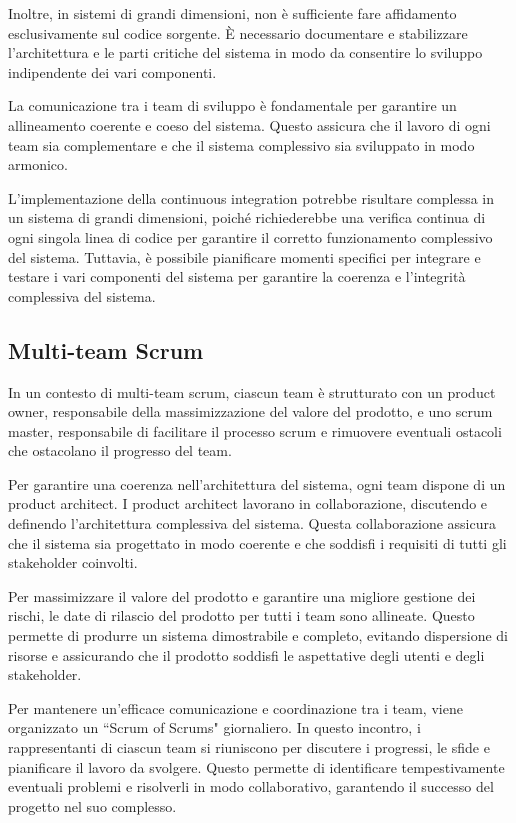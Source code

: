 Inoltre, in sistemi di grandi dimensioni, non è sufficiente fare affidamento
esclusivamente sul codice sorgente. È necessario documentare e stabilizzare
l'architettura e le parti critiche del sistema in modo da consentire lo sviluppo
indipendente dei vari componenti.

La comunicazione tra i team di sviluppo è fondamentale per garantire un allineamento
coerente e coeso del sistema. Questo assicura che il lavoro di ogni team sia complementare
e che il sistema complessivo sia sviluppato in modo armonico.

L'implementazione della continuous integration potrebbe risultare complessa in un sistema
di grandi dimensioni, poiché richiederebbe una verifica continua di ogni singola linea di
codice per garantire il corretto funzionamento complessivo del sistema. Tuttavia, è
possibile pianificare momenti specifici per integrare e testare i vari componenti del
sistema per garantire la coerenza e l'integrità complessiva del sistema.

\subsection{Multi-team Scrum}
In un contesto di multi-team scrum, ciascun team è strutturato con un
product owner, responsabile della massimizzazione del valore del prodotto,
e uno scrum master, responsabile di facilitare il processo
scrum e rimuovere eventuali ostacoli che ostacolano il progresso del team.

Per garantire una coerenza nell'architettura del sistema, ogni team dispone
di un product architect. I product architect lavorano in collaborazione,
discutendo e definendo l'architettura complessiva del sistema. Questa collaborazione
assicura che il sistema sia progettato
in modo coerente e che soddisfi i requisiti di tutti gli stakeholder coinvolti.

Per massimizzare il valore del prodotto e garantire una migliore gestione dei
rischi, le date di rilascio del prodotto per tutti i team sono allineate.
Questo permette di produrre un sistema dimostrabile e completo, evitando
dispersione di risorse e assicurando che il prodotto soddisfi le aspettative
degli utenti e degli stakeholder.

Per mantenere un'efficace comunicazione e coordinazione tra i team, viene
organizzato un ``Scrum of Scrums" giornaliero. In questo incontro, i
rappresentanti di ciascun team si riuniscono per discutere i progressi,
le sfide e pianificare il lavoro da svolgere. Questo permette di identificare
tempestivamente eventuali problemi e risolverli in
modo collaborativo, garantendo il successo del progetto nel suo complesso.